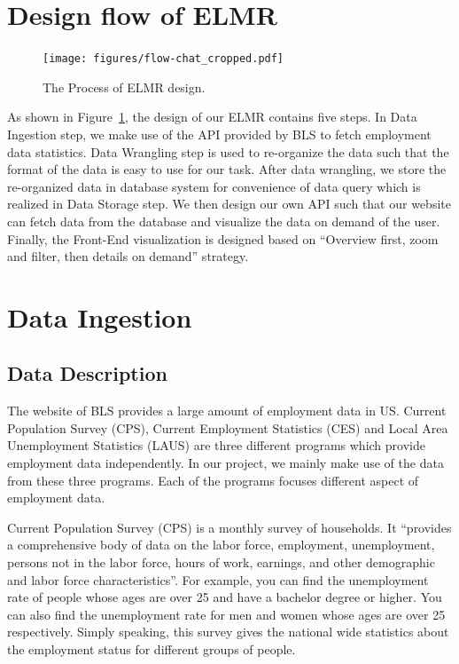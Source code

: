 \documentclass{sigchi}
\begin{document}
\section{Design flow of ELMR}
\begin{figure}[!htbp]
\centering
\texttt{[image: figures/flow-chat\_cropped.pdf]}
\caption{The Process of ELMR design.}
\label{fig:flow}
\end{figure}
As shown in Figure~\ref{fig:flow}, the design of our ELMR contains five steps. In Data Ingestion step, we make use of the API provided by BLS to fetch employment data statistics. Data Wrangling step is used to re-organize the data such that the format of the data is easy to use for our task. After data wrangling, we store the re-organized data in database system for convenience of data query which is realized in Data Storage step. We then design our own API such that our website can fetch data from the database and visualize the data on demand of the user. Finally, the Front-End visualization is designed based on ``Overview first, zoom and filter, then details on demand''\cite{overview} strategy.

\section{Data Ingestion}

\subsection{Data Description}
The website of BLS \cite{Labor_data} provides a large amount of employment data in US. Current Population Survey (CPS), Current Employment Statistics (CES) and Local Area Unemployment Statistics (LAUS) are three different programs which provide employment data independently. In our project, we mainly make use of the data from these three programs. Each of the programs focuses different aspect of employment data.

Current Population Survey (CPS) \cite{CPS} is a monthly survey of households. It ``provides a comprehensive body of data on the labor force, employment, unemployment, persons not in the labor force, hours of work, earnings, and other demographic and labor force characteristics''. For example, you can find the unemployment rate of people whose ages are over 25 and have a bachelor degree or higher. You can also find the unemployment rate for men and women whose ages are over 25 respectively. Simply speaking, this survey gives the national wide statistics about the employment status for different groups of people.
\end{document}
